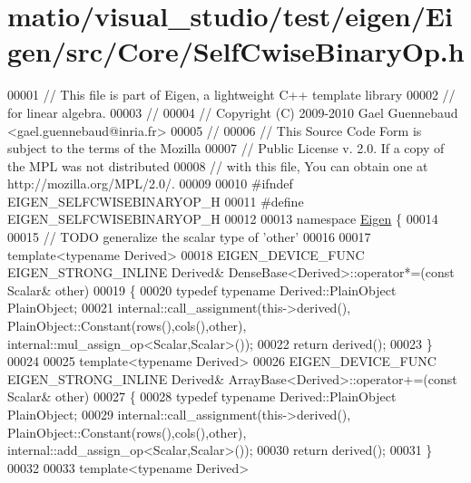 \hypertarget{matio_2visual__studio_2test_2eigen_2_eigen_2src_2_core_2_self_cwise_binary_op_8h_source}{}\section{matio/visual\+\_\+studio/test/eigen/\+Eigen/src/\+Core/\+Self\+Cwise\+Binary\+Op.h}
\label{matio_2visual__studio_2test_2eigen_2_eigen_2src_2_core_2_self_cwise_binary_op_8h_source}

\begin{DoxyCode}
00001 \textcolor{comment}{// This file is part of Eigen, a lightweight C++ template library}
00002 \textcolor{comment}{// for linear algebra.}
00003 \textcolor{comment}{//}
00004 \textcolor{comment}{// Copyright (C) 2009-2010 Gael Guennebaud <gael.guennebaud@inria.fr>}
00005 \textcolor{comment}{//}
00006 \textcolor{comment}{// This Source Code Form is subject to the terms of the Mozilla}
00007 \textcolor{comment}{// Public License v. 2.0. If a copy of the MPL was not distributed}
00008 \textcolor{comment}{// with this file, You can obtain one at http://mozilla.org/MPL/2.0/.}
00009 
00010 \textcolor{preprocessor}{#ifndef EIGEN\_SELFCWISEBINARYOP\_H}
00011 \textcolor{preprocessor}{#define EIGEN\_SELFCWISEBINARYOP\_H}
00012 
00013 \textcolor{keyword}{namespace }\hyperlink{namespace_eigen}{Eigen} \{ 
00014 
00015 \textcolor{comment}{// TODO generalize the scalar type of 'other'}
00016 
00017 \textcolor{keyword}{template}<\textcolor{keyword}{typename} Derived>
00018 EIGEN\_DEVICE\_FUNC EIGEN\_STRONG\_INLINE Derived& DenseBase<Derived>::operator*=(\textcolor{keyword}{const} Scalar& other)
00019 \{
00020   \textcolor{keyword}{typedef} \textcolor{keyword}{typename} Derived::PlainObject PlainObject;
00021   internal::call\_assignment(this->derived(), PlainObject::Constant(rows(),cols(),other), 
      internal::mul\_assign\_op<Scalar,Scalar>());
00022   \textcolor{keywordflow}{return} derived();
00023 \}
00024 
00025 \textcolor{keyword}{template}<\textcolor{keyword}{typename} Derived>
00026 EIGEN\_DEVICE\_FUNC EIGEN\_STRONG\_INLINE Derived& ArrayBase<Derived>::operator+=(\textcolor{keyword}{const} Scalar& other)
00027 \{
00028   \textcolor{keyword}{typedef} \textcolor{keyword}{typename} Derived::PlainObject PlainObject;
00029   internal::call\_assignment(this->derived(), PlainObject::Constant(rows(),cols(),other), 
      internal::add\_assign\_op<Scalar,Scalar>());
00030   \textcolor{keywordflow}{return} derived();
00031 \}
00032 
00033 \textcolor{keyword}{template}<\textcolor{keyword}{typename} Derived>

\end{DoxyCode}
